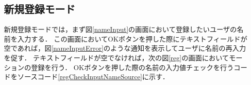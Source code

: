 \documentclass[11pt]{jreport}
\begin{document}
\newpage
        \subsection{新規登録モード}
        新規登録モードでは，まず図\ref{nameInput}の画面において登録したいユーザの名前を入力する．
        この画面においてOKボタンを押した際にテキストフィールドが空であれば，図\ref{nameInputError}のような通知を表示してユーザに名前の再入力を促す．
        テキストフィールドが空でなければ，次の図\ref{reg}の画面においてモーションの登録を行う．
        OKボタンを押した際の名前の入力値チェックを行うコードをソースコード\ref{regCheckInputNameSource}に示す．
\end{document}
